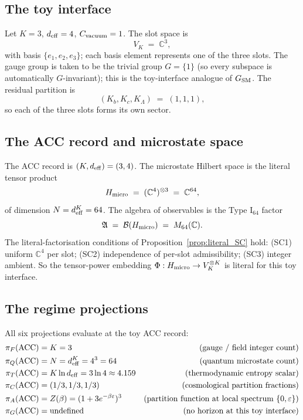 \documentclass[11pt]{article}
\theoremstyle{plain}
\theoremstyle{definition}
\theoremstyle{remark}
\begin{document}
\subsection{The toy interface}\label{supp:R1}

Let $K = 3$, $d_{\rm eff} = 4$, $C_{\rm vacuum} = 1$.  The slot space is
\[
  V_K \;=\; \mathbb{C}^3,
\]
with basis $\{e_1, e_2, e_3\}$; each basis element represents one of the three slots.  The gauge group is taken to be the trivial group $G = \{1\}$ (so every subspace is automatically $G$-invariant); this is the toy-interface analogue of $G_{\rm SM}$.  The residual partition is
\[
  (K_b, K_c, K_\Lambda) \;=\; (1, 1, 1),
\]
so each of the three slots forms its own sector.

\bigskip

\subsection{The ACC record and microstate space}\label{supp:R2}

The ACC record is $(K, d_{\rm eff}) = (3, 4)$.  The microstate Hilbert space is the literal tensor product
\[
  H_{\rm micro} \;=\; (\mathbb{C}^4)^{\otimes 3} \;=\; \mathbb{C}^{64},
\]
of dimension $N = d_{\rm eff}^K = 64$.  The algebra of observables is the Type I$_{64}$ factor
\[
  \mathfrak{A} \;=\; \mathcal{B}(H_{\rm micro}) \;=\; M_{64}(\mathbb{C}).
\]
The literal-factorisation conditions of Proposition~\ref{prop:literal_SC} hold: (SC1) uniform $\mathbb{C}^4$ per slot; (SC2) independence of per-slot admissibility; (SC3) integer ambient.  So the tensor-power embedding $\Phi : H_{\rm micro} \to V_K^{\otimes K}$ is literal for this toy interface.

\bigskip

\subsection{The regime projections}\label{supp:R3}

All six projections evaluate at the toy ACC record:
\begin{align*}
  \pi_F(\mathrm{ACC}) &= K = 3 & \text{(gauge / field integer count)} \\
  \pi_Q(\mathrm{ACC}) &= N = d_{\rm eff}^K = 4^3 = 64 & \text{(quantum microstate count)} \\
  \pi_T(\mathrm{ACC}) &= K \ln d_{\rm eff} = 3 \ln 4 \approx 4.159 & \text{(thermodynamic entropy scalar)} \\
  \pi_C(\mathrm{ACC}) &= (1/3, 1/3, 1/3) & \text{(cosmological partition fractions)} \\
  \pi_A(\mathrm{ACC}) &= Z(\beta) = (1 + 3 e^{-\beta\varepsilon})^3 & \text{(partition function at local spectrum }\{0, \varepsilon\}) \\
  \pi_G(\mathrm{ACC}) &= \text{undefined} & \text{(no horizon at this toy interface)}
\end{align*}
\end{document}
